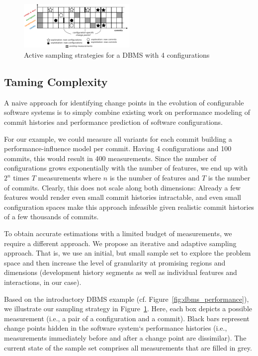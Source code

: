 \documentclass[sigconf]{acmart}
\begin{document}
	\begin{figure}
		\includegraphics[width=0.5\textwidth]{images/sampling_plan}
		
		\caption{Active sampling strategies for a DBMS with 4 configurations}
		\label{fig:sampling plan}
	\end{figure}
	
	\subsection{Taming Complexity}
	A naive approach for identifying change points in the evolution of configurable software systems is to simply combine existing work on performance modeling of commit histories and performance prediction of software configurations.
	
	For our example, we could measure all variants for each commit building a performance-influence model per commit.
	Having 4 configurations and 100 commits, this would result in 400 measurements.
	Since the number of configurations grows exponentially with the number of features, we end up with $2^n$ times $T$ measurements where $n$ is the number of features and $T$ is the number of commits.
	Clearly, this does not scale along both dimensions: Already a few features would render even small commit histories intractable, and even small configuration spaces make this approach infeasible given realistic commit histories of a few thousands of commits.
	
	To obtain accurate estimations with a limited budget of measurements, we require a different approach. We propose an iterative and adaptive sampling approach. That is, we use an initial, but small sample set to explore the problem space and then increase the level of granularity at promising regions and dimensions (development history segments as well as individual features and interactions, in our case). 
	
	Based on the introductory DBMS example (cf. Figure~\ref{fig:dbms_performance}), we illustrate our sampling strategy in Figure~\ref{fig:sampling plan}. Here, each box depicts a possible measurement (i.e., a pair of a configuration and a commit). Black bars represent change points hidden in the software system‘s performance histories (i.e., measurements immediately before and after a change point are dissimilar). The current state of the sample set comprises all measurements that are filled in grey. 
	
\end{document}
